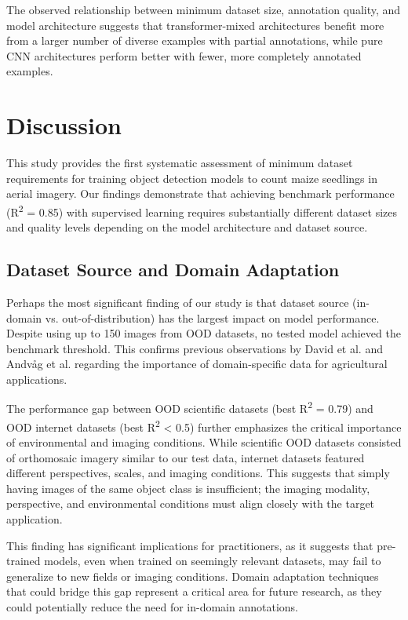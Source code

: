 \documentclass{article}
\begin{document}
The observed relationship between minimum dataset size, annotation quality, and model architecture suggests that transformer-mixed architectures benefit more from a larger number of diverse examples with partial annotations, while pure CNN architectures perform better with fewer, more completely annotated examples.

\section{Discussion}

This study provides the first systematic assessment of minimum dataset requirements for training object detection models to count maize seedlings in aerial imagery. Our findings demonstrate that achieving benchmark performance (R\textsuperscript{2} = 0.85) with supervised learning requires substantially different dataset sizes and quality levels depending on the model architecture and dataset source.

\subsection{Dataset Source and Domain Adaptation}

Perhaps the most significant finding of our study is that dataset source (in-domain vs. out-of-distribution) has the largest impact on model performance. Despite using up to 150 images from OOD datasets, no tested model achieved the benchmark threshold. This confirms previous observations by David et al. \cite{davidPlantDetectionCounting2021} and Andvåg et al. \cite{andvaagCountingCanolaGeneralizable2024} regarding the importance of domain-specific data for agricultural applications.

The performance gap between OOD scientific datasets (best R\textsuperscript{2} = 0.79) and OOD internet datasets (best R\textsuperscript{2} < 0.5) further emphasizes the critical importance of environmental and imaging conditions. While scientific OOD datasets consisted of orthomosaic imagery similar to our test data, internet datasets featured different perspectives, scales, and imaging conditions. This suggests that simply having images of the same object class is insufficient; the imaging modality, perspective, and environmental conditions must align closely with the target application.

This finding has significant implications for practitioners, as it suggests that pre-trained models, even when trained on seemingly relevant datasets, may fail to generalize to new fields or imaging conditions. Domain adaptation techniques that could bridge this gap represent a critical area for future research, as they could potentially reduce the need for in-domain annotations.
\end{document}
